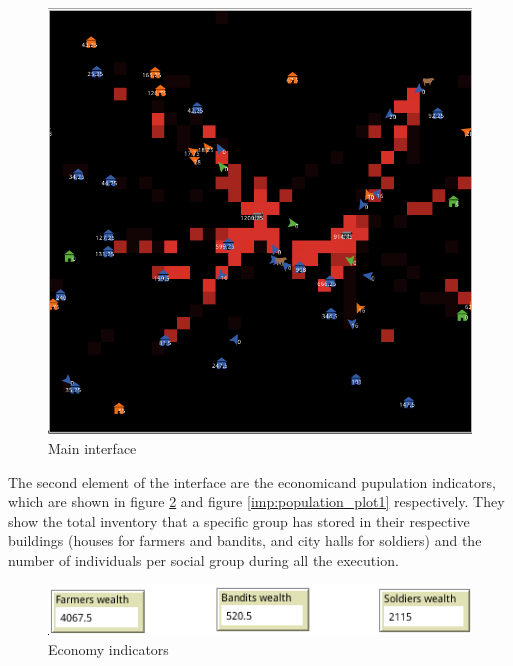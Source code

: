 \documentclass{wscpaperproc}
\begin{document}
\begin{figure}[h!]
    \centering
    \includegraphics[scale=0.65]{Images/Interface1}
    \caption{Main interface}
    \label{imp:main_interface1}
\end{figure}

The second element of the interface are the economicand pupulation indicators,
which are shown in figure \ref{imp:economy1} and figure
\ref{imp:population_plot1} respectively. They show the total inventory that
a specific group has stored in their respective buildings (houses for
farmers and bandits, and city halls for soldiers) and the number of
individuals per social group during all the execution.\\

\begin{figure}[h!]
    \centering
    \includegraphics[scale=0.5]{Images/Economy1}
    \caption{Economy indicators}
    \label{imp:economy1}
\end{figure}
\end{document}
